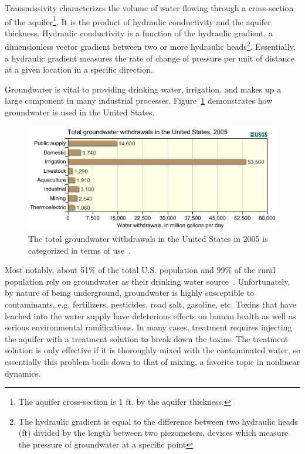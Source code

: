 \noindent Transmissivity characterizes the volume of water flowing through a
 cross-section of the aquifer\footnote{The aquifer cross-section is 1
   ft. by the aquifer thickness.}. It is the product of hydraulic
 conductivity and the aquifer thickness. Hydraulic conductivity is a
 function of the hydraulic gradient, a dimensionless vector gradient between two or more hydraulic heads\footnote{The hydraulic gradient is equal to the difference between two hydraulic heads (ft) divided by
 the length between two piezometers, devices which measure the
 pressure of groundwater at a specific point}. Essentially, a
hydraulic gradient measures the rate of change of pressure per unit of
distance at a given location in a specific direction.

Groundwater is vital
to providing drinking water, irrigation, and makes up a large
component in many industrial processes. Figure~\ref{fig:gwuse}
demonstrates how groundwater is used in the United States. 
\begin{figure}[!h]
\caption[Groundwater usage in the United States in 2005]{The total
  groundwater withdrawals in the United States in 2005 is categorized
  in terms of use~\cite{usgsgw}.}\label{fig:gwuse}
    \begin{center}
	\includegraphics[scale=0.8]{figs/gwuse.png}
    \end{center}
\end{figure}
Most
notably, about 51\% of the total U.S. population and 99\% of the
rural population rely on groundwater as their drinking water
source~\cite{gw}. Unfortunately, by nature of being underground,
groundwater is highly susceptible to contaminants, e.g. fertilizers,
pesticides, road salt, gasoline, etc. Toxins that have leached into
the water supply have deleterious effects on human health as well as
serious environmental ramifications. In many cases, treatment requires injecting the aquifer with a treatment solution to break down the toxins. The treatment solution is only effective if it is thoroughly mixed with the contaminated water, so essentially this problem boils down to that of mixing, a favorite topic in nonlinear dynamics. 


